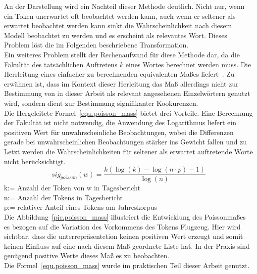 An der Darstellung wird ein Nachteil dieser Methode deutlich. Nicht nur, wenn ein Token unerwartet oft beobachtet werden kann, auch wenn er seltener als erwartet beobachtet werden kann sinkt die Wahrscheinlichkeit nach diesem Modell beobachtet zu werden und es erscheint als relevantes Wort. Dieses Problem löst die im Folgenden beschriebene Transformation.\\

Ein weiteres Problem stellt der Rechenaufwand für diese Methode dar, da die Fakultät des tatsächlichen Auftretens $k$ eines Wortes berechnet werden muss. Die Herrleitung eines einfacher zu berechnenden 
equivalenten Maßes liefert~\cite[S. 338 ff]{heyer06}. Zu erwähnen ist, dass im Kontext dieser Herleitung das Maß allerdings nicht zur Bestimmung von in dieser Arbeit als relevant angesehenen Einzelwörtern genutzt wird, sondern dient zur Bestimmung signifikanter Kookurenzen. \\
Die Hergeleitete Formel~\ref{equ.poisson_mass} bietet drei Vorteile. Eine Berechnung der Fakultät ist nicht notwendig, die Anwendung des Logarithmus liefert ein positiven Wert für unwahrscheinliche Beobachtungen, wobei die Differenzen gerade bei unwahrscheinlichen Beobachtungen stärker ins Gewicht fallen und zu Letzt werden die Wahrscheinlichkeiten für seltener als erwartet auftretende Worte nicht berücksichtigt. 
 \begin{equation}\label{equ.poisson_mass}
		sig_{poisson}(w) = \frac{k(\log(k)-\log(n\cdot p) -1)}{\log(n)} 
 \end{equation}
k:= Anzahl der Token von w in Tagesbericht\\
n:= Anzahl der Tokens in Tagesbericht\\
p:= relativer Anteil eines Tokens am Jahreskorpus\\

Die Abbildung~\ref{pic.poisson_mass} illustriert die Entwicklung des Poissonmaßes es bezogen auf die Variation des Vorkommens des Tokens Flugzeug. Hier wird sichtbar, dass die unterrepräsentetion keinen positiven Wert erzeugt und somit keinen Einfluss auf eine nach diesem Maß  geordnete Liste hat. In der Praxis sind genügend positive Werte dieses Maß es zu beobachten.\\
Die Formel~\ref{equ.poisson_mass} wurde im praktischen Teil dieser Arbeit genutzt.\\
 
